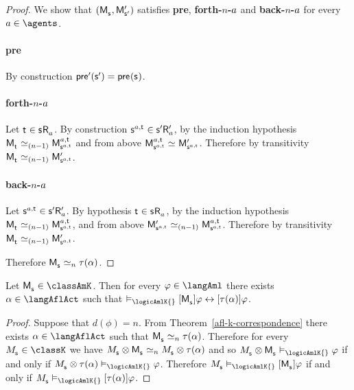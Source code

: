 \begin{proof}
We show that $(\aPModel{\aStateS}, \aPModelP{\aStateSP})$ satisfies {\bf pre}, {\bf forth-$n$-$a$} and {\bf back-$n$-$a$} for every $\agentA \in \agents$.

\paragraph{pre} By construction
$\aPreconditionP(\aStateSP) = \aPrecondition(\aStateS)$.

\paragraph{forth-$n$-$a$} 
Let $\aStateT \in \aStateS \aAccessibility{\agentA}$.
By construction $\aStateS[\agentA,\aStateT] \in \aStateSP \aAccessibilityP{\agentA}$, by the induction hypothesis $\aPModel{\aStateT} \bisimilar[(n - 1)] \aPModel[\agentA,\aStateT]{\aStateS[\agentA,\aStateT]}$ and from above $\aPModel[\agentA,\aStateT]{\aStateS[\agentA,\aStateT]} \bisimilar \aPModelP{\aStateS[\agentA,\aStateT]}$.
Therefore by transitivity $\aPModel{\aStateT} \bisimilar[(n - 1)] \aPModelP{\aStateS[\agentA,\aStateT]}$.

\paragraph{back-$n$-$a$} 
Let $\aStateS[\agentA,\aStateT] \in \aSuccessorsPA{\aStateSP}$.
By hypothesis $\aStateT \in \aSuccessorsA{\aStateS}$, by the induction hypothesis $\aPModel{\aStateT} \bisimilar[(n-1)] \aPModel[\agentA,\aStateT]{\aStateS[\agentA,\aStateT]}$, and from above $\aPModelP{\aStateS[\agentA,\aStateT]} \bisimilar[(n - 1)] \aPModel[\agentA,\aStateT]{\aStateS[\agentA,\aStateT]}$.
Therefore by transitivity $\aPModel{\aStateT} \bisimilar[(n - 1)] \aPModelP{\aStateS[\agentA,\aStateT]}$.

Therefore $\aPModel{\aStateS} \bisimilar[n] \tau(\alpha)$.
\end{proof}

\begin{corollary}\label{afl-k-correspondence-aml-allacts}
Let $\aPModel{\aStateS} \in \classAmK$.
Then for every $\phi \in \langAml$ there exists $\alpha \in \langAflAct$ such that $\entails_\logicAmlK{} \actionA{\aPModel{\aStateS}} \phi \iff \actionA{\tau(\alpha)} \phi$.
\end{corollary}

\begin{proof}
Suppose that $d(\phi) = n$.
From Theorem~\ref{afl-k-correspondence} there exists $\alpha \in \langAflAct$ such that $\aPModel{\aStateS} \bisimilar[n] \tau(\alpha)$.
Therefore for every $\kPModel{\aStateS} \in \classK$ we have $\kPModel{\aStateS} \exec \aPModel{\aStateS} \bisimilar[n] \kPModel{\aStateS} \exec \tau(\alpha)$ and so $\kPModel{\aStateS} \exec \aPModel{\aStateS} \entails_\logicAmlK{} \phi$ if and only if $\kPModel{\aStateS} \exec \tau(\alpha) \entails_\logicAmlK{} \phi$.
Therefore $\kPModel{\aStateS} \entails_\logicAmlK{} \actionA{\aPModel{\aStateS}}  \phi$ if and only if $\kPModel{\aStateS} \entails_\logicAmlK{} \actionA{\tau(\alpha)}  \phi$.
\end{proof}

